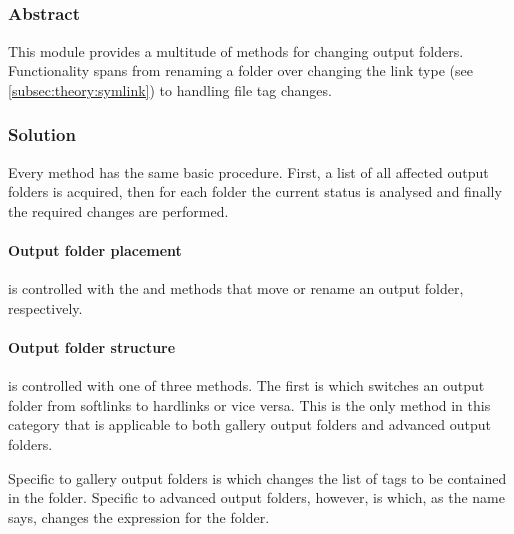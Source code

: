 \subsection{}
\def\kapitelautor{Clemens Stadlbauer}

\subsubsection{Abstract}

This module provides a multitude of methods for changing output folders.
Functionality spans from renaming a folder over changing the link type (see
\cref{subsec:theory:symlink}) to handling file tag changes.

\subsubsection{Solution} %

Every method has the same basic procedure. First, a list of all affected output
folders is acquired, then for each folder the current status is analysed and
finally the required changes are performed.


\paragraph{Output folder placement}

is controlled with the  and  methods that move or
rename an output folder, respectively.

\paragraph{Output folder structure} %

is controlled with one of three methods. The first is 
which switches an output folder from softlinks to hardlinks or vice versa. This
is the only method in this category that is applicable to both gallery output
folders and advanced output folders.

Specific to gallery output folders is  which changes
the list of tags to be contained in the folder. Specific to advanced output
folders, however, is  which, as the name says,
changes the expression for the folder.

